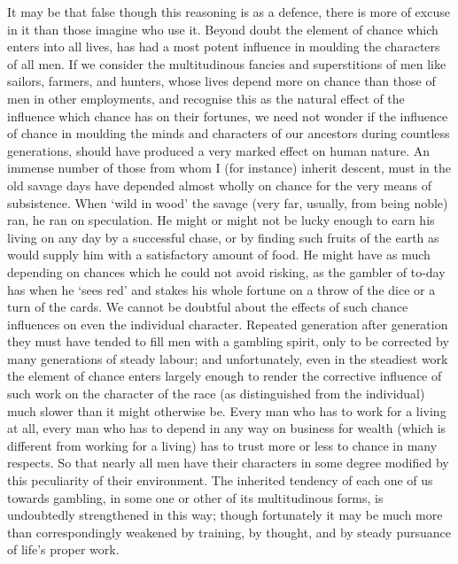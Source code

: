 \documentclass[letterpaper,12pt,oneside,openany]{memoir}
\begin{document}
It may be that false though this reasoning is as a
defence, there is more of excuse in it than those imagine
who use it. Beyond doubt the element of chance which
enters into all lives, has had a most potent influence in
moulding the characters of all men. If we consider the
multitudinous fancies and superstitions of men like
sailors, farmers, and hunters, whose lives depend more
on chance than those of men in other employments, and
recognise this as the natural effect of the influence
which chance has on their fortunes, we need not wonder
if the influence of chance in moulding the minds and
characters of our ancestors during countless generations,
should have produced a very marked effect on human
nature. An immense number of those from whom I
(for instance) inherit descent, must in the old savage
days have depended almost wholly on chance for the
very means of subsistence. When `wild in wood' the
savage (very far, usually, from being noble) ran, he ran
on speculation. He might or might not be lucky
enough to earn his living on any day by a successful
chase, or by finding such fruits of the earth as would
supply him with a satisfactory amount of food. He
might have as much depending on chances which he
could not avoid risking, as the gambler of to-day has
when he `sees red' and stakes his whole fortune on
a throw of the dice or a turn of the cards. We cannot
be doubtful about the effects of such chance influences
on even the individual character. Repeated generation
after generation they must have tended to fill men with
a gambling spirit, only to be corrected by many generations
of steady labour; and unfortunately, even in the
steadiest work the element of chance enters largely
enough to render the corrective influence of such work
on the character of the race (as distinguished from the
individual) much slower than it might otherwise be.
Every man who has to work for a living at all, every
man who has to depend in any way on business for
wealth (which is different from working for a living)
has to trust more or less to chance in many respects.
So that nearly all men have their characters in some
degree modified by this peculiarity of their environment.
The inherited tendency of each one of us towards
gambling, in some one or other of its multitudinous
forms, is undoubtedly strengthened in this way; though
fortunately it may be much more than correspondingly
weakened by training, by thought, and by steady pursuance
of life's proper work.
\end{document}
